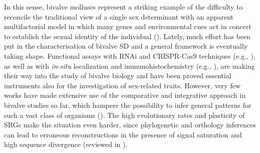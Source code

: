 \documentclass[../main.tex]{subfiles}
\begin{document}
In this sense, bivalve molluscs represent a striking example of the difficulty to reconcile the traditional view of a single sex determinant with an apparent multifactorial model in which many genes and environmental cues act in concert to establish the sexual identity of the individual (\textbf{\cite{breton2018sex}}). Lately, much effort has been put in the characterisation of bivalve SD and a general framework is eventually taking shape. Functional assays with RNAi and CRISPR-Cas9 techniques (e.g., \textbf{\cite{wang2020identification,sun2022examination,wang2022transcriptome}}), as well as with \textit{in-situ} localization and immunohistochemistry (e.g., \textbf{\cite{perez2011cytogenetic,milani2013nuclear}}), are making their way into the study of bivalve biology and have been proved essential instruments also for the investigation of sex-related traits. However, very few works have made extensive use of the comparative and integrative approach in bivalve studies so far, which hampers the possibility to infer general patterns for such a vast class of organisms (\textbf{\cite{milani2020faraway}}). The high evolutionary rates and plasticity of SRGs make the situation even harder, since phylogenetic and orthology inferences can lead to erroneous reconstructions in the presence of signal saturation and high sequence divergence (reviewed in \textbf{\cite{natsidis2021systematic,lozano2022practical}}).
\end{document}
